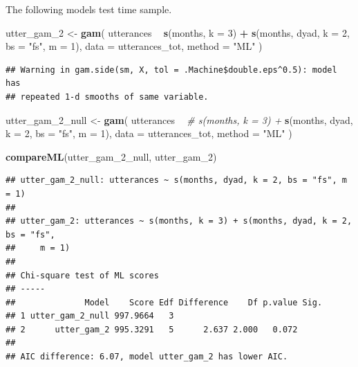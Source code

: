 \documentclass[]{article}
\newenvironment{Shaded}{\begin{snugshade}}{\end{snugshade}}
\newcommand{\CommentTok}[1]{\textcolor[rgb]{0.56,0.35,0.01}{\textit{#1}}}
\newcommand{\DataTypeTok}[1]{\textcolor[rgb]{0.13,0.29,0.53}{#1}}
\newcommand{\DecValTok}[1]{\textcolor[rgb]{0.00,0.00,0.81}{#1}}
\newcommand{\KeywordTok}[1]{\textcolor[rgb]{0.13,0.29,0.53}{\textbf{#1}}}
\newcommand{\NormalTok}[1]{#1}
\newcommand{\OperatorTok}[1]{\textcolor[rgb]{0.81,0.36,0.00}{\textbf{#1}}}
\newcommand{\StringTok}[1]{\textcolor[rgb]{0.31,0.60,0.02}{#1}}
\begin{document}
The following models test time sample.

\begin{Shaded}
\begin{Highlighting}[]
\NormalTok{utter_gam_}\DecValTok{2}\NormalTok{ <-}\StringTok{ }\KeywordTok{gam}\NormalTok{(}
\NormalTok{  utterances }\OperatorTok{~}
\StringTok{    }\KeywordTok{s}\NormalTok{(months, }\DataTypeTok{k =} \DecValTok{3}\NormalTok{) }\OperatorTok{+}
\StringTok{    }\KeywordTok{s}\NormalTok{(months, dyad, }\DataTypeTok{k =} \DecValTok{2}\NormalTok{, }\DataTypeTok{bs =} \StringTok{"fs"}\NormalTok{, }\DataTypeTok{m =} \DecValTok{1}\NormalTok{),}
  \DataTypeTok{data =}\NormalTok{ utterances_tot,}
  \DataTypeTok{method =} \StringTok{"ML"}
\NormalTok{)}
\end{Highlighting}
\end{Shaded}

\begin{verbatim}
## Warning in gam.side(sm, X, tol = .Machine$double.eps^0.5): model has
## repeated 1-d smooths of same variable.
\end{verbatim}

\begin{Shaded}
\begin{Highlighting}[]
\NormalTok{utter_gam_}\DecValTok{2}\NormalTok{_null <-}\StringTok{ }\KeywordTok{gam}\NormalTok{(}
\NormalTok{  utterances }\OperatorTok{~}
\StringTok{    }\CommentTok{# s(months, k = 3) +}
\StringTok{    }\KeywordTok{s}\NormalTok{(months, dyad, }\DataTypeTok{k =} \DecValTok{2}\NormalTok{, }\DataTypeTok{bs =} \StringTok{"fs"}\NormalTok{, }\DataTypeTok{m =} \DecValTok{1}\NormalTok{),}
  \DataTypeTok{data =}\NormalTok{ utterances_tot,}
  \DataTypeTok{method =} \StringTok{"ML"}
\NormalTok{)}

\KeywordTok{compareML}\NormalTok{(utter_gam_}\DecValTok{2}\NormalTok{_null, utter_gam_}\DecValTok{2}\NormalTok{)}
\end{Highlighting}
\end{Shaded}

\begin{verbatim}
## utter_gam_2_null: utterances ~ s(months, dyad, k = 2, bs = "fs", m = 1)
## 
## utter_gam_2: utterances ~ s(months, k = 3) + s(months, dyad, k = 2, bs = "fs", 
##     m = 1)
## 
## Chi-square test of ML scores
## -----
##              Model    Score Edf Difference    Df p.value Sig.
## 1 utter_gam_2_null 997.9664   3                              
## 2      utter_gam_2 995.3291   5      2.637 2.000   0.072     
## 
## AIC difference: 6.07, model utter_gam_2 has lower AIC.
\end{verbatim}
\end{document}
